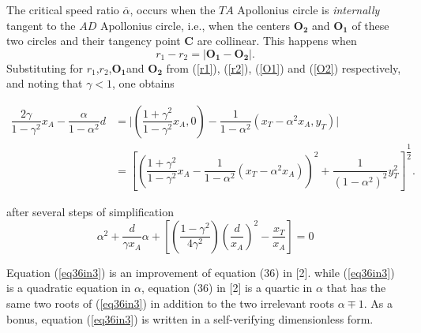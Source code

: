 \documentclass{beamer}
\begin{document}
\begin{frame}
The critical speed ratio $\overline{\alpha}$, occurs when the $TA$ Apollonius circle is \textit{internally} tangent to the $AD$ Apollonius circle, i.e., when the centers $\boldsymbol{O_{2}}$ and $\boldsymbol{O_{1}}$ of these two circles and their tangency point $\boldsymbol{C}$ are collinear. This happens when
\begin{equation}
r_{1}-r_{2}=\lvert\boldsymbol{O_{1}}-\boldsymbol{O_{2}}\rvert.
\label{dr_fd}
\end{equation}
Substituting for $r_{1}$,$r_{2}$,$\boldsymbol{O_1}$and $\boldsymbol{O_{2}}$ from (\ref{r1}), (\ref{r2}), (\ref{O1}) and (\ref{O2}) respectively, and noting that $\gamma<1$, one obtains

\begin{equation}
\begin{split}
\dfrac{2\gamma}{1-\gamma^{2}}x_{A}-\dfrac{\alpha}{1-\alpha^{2}}d 
&=\lvert(\dfrac{1+\gamma^{2}}{1-\gamma^{2}}x_{A},0)-\dfrac{1}{1-\alpha^{2}}(x_{T}-\alpha^{2}x_{A},y_{T})\rvert\\
&=[(\dfrac{1+\gamma^{2}}{1-\gamma^{2}}x_{A}-\dfrac{1}{1-\alpha^{2}}(x_{T}-\alpha^{2}x_{A}))^{2}+\dfrac{1}{(1-\alpha^{2})^{2}}y_{T}^2]^{\dfrac{1}{2}}.
\end{split}
\label{generaleq}
\end{equation}
\end{frame}
\begin{frame}
after several  steps of simplification
\begin{equation}
\boxed{
\alpha^{2}+\dfrac{d}{\gamma x_{A}}\alpha +[(\dfrac{1-\gamma^{2}}{4\gamma^{2}})(\dfrac{d}{x_{A}})^{2}-\dfrac{x_{T}}{x_{A}}]=0}
\label{eq36in3}
\end{equation}

Equation (\ref{eq36in3}) is an improvement of equation (36) in [2].
while (\ref{eq36in3}) is a quadratic equation in $\alpha$, equation (36) in [2] is a quartic in $\alpha$ that has the same  two roots of (\ref{eq36in3}) in addition to the two irrelevant roots $\alpha\mp1$. As a bonus, equation (\ref{eq36in3}) is written in a self-verifying dimensionless form.
\end{frame}
\end{document}
